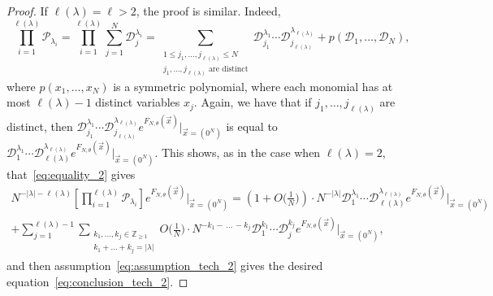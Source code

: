 \documentclass[10pt,a4paper]{amsart}
\newcommand{\D}{\mathcal D}
\renewcommand{\P}{\mathcal P}
\newcommand{\Z}{\mathbb Z}
\newcommand{\la}{\lambda}
\newcommand{\vecx}{\vec{x}}
\newcommand{\zeroes}{\vec{x}=(0^N)}
\begin{document}
\begin{proof}
If $\ell(\la)=\ell>2$, the proof is similar.
Indeed,
\begin{equation}\label{eq:equality_2}
\prod_{i=1}^{\ell(\la)}{\P_{\la_i}} = \prod_{i=1}^{\ell(\la)}{\sum_{j=1}^N{\D_j^{\la_i}}} = \sum_{\substack{1\le j_1,\dots,j_{\ell(\la)}\le N \\ j_1,\dots,j_{\ell(\la)}\text{ are distinct}}}{\D_{j_1}^{\la_1}\cdots\D_{j_{\ell(\la)}}^{\la_{\ell(\la)}}} + p(\D_1,\dots,\D_N),
\end{equation}
where $p(x_1,\dots,x_N)$ is a symmetric polynomial, where each monomial has at most $\ell(\la)-1$ distinct variables $x_j$.
Again, we have that if $j_1,\dots,j_{\ell(\la)}$ are distinct, then $\D_{j_1}^{\la_1}\cdots\D_{j_{\ell(\la)}}^{\la_{\ell(\la)}} e^{F_{N,\theta}(\vecx)}\big|_{\vecx=(0^N)}$ is equal to $\D_1^{\la_1}\cdots\D_{\ell(\la)}^{\la_{\ell(\la)}} e^{F_{N,\theta}(\vecx)}\big|_{\vecx=(0^N)}$. This shows, as in the case when $\ell(\la)=2$, that~\eqref{eq:equality_2} gives
\begin{multline*}
N^{-|\la|-\ell(\la)} \left[\prod_{i=1}^{\ell(\la)}{\P_{\la_i}}\right]  e^{F_{N,\theta}(\vecx)} \bigg|_{\vecx=(0^N)} = \left( 1 + O\Big( \frac{1}{N} \Big) \right)\cdot N^{-|\la|} \D_1^{\la_1}\cdots\D_{\ell(\la)}^{\la_{\ell(\la)}} e^{F_{N,\theta}(\vecx)}\big|_{\zeroes}\\
+ \sum_{j=1}^{\ell(\la)-1} \sum_{\substack{k_1,\dots,k_j\in\Z_{\ge 1} \\ k_1+\dots+k_j=|\la|}} O\Big( \frac{1}{N} \Big)\cdot N^{-k_1-\,\dots\,-k_j} \D_1^{k_1}\cdots\D_j^{k_j} e^{F_{N,\theta}(\vecx)}\big|_{\zeroes},
\end{multline*}
and then assumption~\eqref{eq:assumption_tech_2} gives the desired equation~\eqref{eq:conclusion_tech_2}.
\end{proof}
\end{document}
